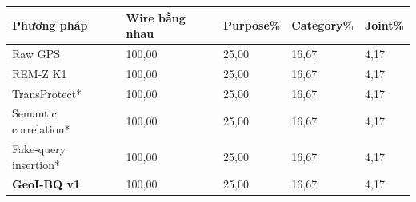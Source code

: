 \par\smallskip\noindent\begin{tabularx}{\linewidth}{@{}P{3.2cm}XXXX@{}}\toprule
\textbf{Phương pháp} & \textbf{Wire bằng nhau} & \textbf{Purpose\%} & \textbf{Category\%} & \textbf{Joint\%} \\
\midrule
Raw GPS & 100{,}00 & 25{,}00 & 16{,}67 & 4{,}17 \\
REM-Z K1 & 100{,}00 & 25{,}00 & 16{,}67 & 4{,}17 \\
TransProtect* & 100{,}00 & 25{,}00 & 16{,}67 & 4{,}17 \\
Semantic correlation* & 100{,}00 & 25{,}00 & 16{,}67 & 4{,}17 \\
Fake-query insertion* & 100{,}00 & 25{,}00 & 16{,}67 & 4{,}17 \\
\textbf{GeoI-BQ v1} & 100{,}00 & 25{,}00 & 16{,}67 & 4{,}17 \\
\bottomrule\end{tabularx}\par\smallskip
